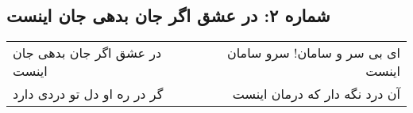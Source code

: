 \begin{center}
\section*{شماره ۲: در عشق اگر جان بدهی جان اینست}
\label{sec:002}
\begin{longtable}{l p{0.5cm} r}
در عشق اگر جان بدهی جان اینست
&&
ای بی سر و سامان! سرو سامان اینست
\\
گر در ره او دل تو دردی دارد
&&
آن درد نگه دار که درمان اینست
\\
\end{longtable}
\end{center}
